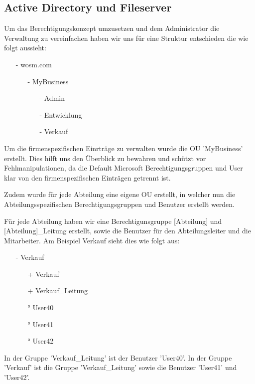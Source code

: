 \documentclass[11pt,a4paper,parskip=half]{scrartcl}
\begin{document}
\subsection{Active Directory und Fileserver}
Um das Berechtigungskonzept umzusetzen und dem Administrator die Verwaltung zu vereinfachen haben wir uns für eine Struktur entschieden die wie folgt aussieht:
\begin{itemize}
\item[-]{wosm.com}
\begin{itemize}
\item[-]{MyBusiness}
\begin{itemize}
\item[-]{Admin}
\item[-]{Entwicklung}
\item[-]{Verkauf}
\end{itemize}
\end{itemize}
\end{itemize}
Um die firmenspezifischen Einrträge zu verwalten wurde die OU 'MyBusiness' erstellt. Dies hilft uns den Überblick zu bewahren und schützt vor Fehlmanipulationen, da die Default Microsoft Berechtigungsgruppen und User klar von den firmenspezifischen Einträgen getrennt ist.

Zudem wurde für jede Abteilung eine eigene OU erstellt, in welcher nun die Abteilungsspezifischen Berechtigungsgruppen und Benutzer erstellt werden.

Für jede Abteilung haben wir eine Berechtigunsgruppe [Abteilung] und [Abteilung]\_Leitung erstellt, sowie die Benutzer für den Abteilungsleiter und die Mitarbeiter. Am Beispiel Verkauf sieht dies wie folgt aus:
\begin{itemize}
\item[-]{Verkauf}
\begin{itemize}
\item[+]{Verkauf}
\item[+]{Verkauf\_Leitung}
\item[°]{User40}
\item[°]{User41}
\item[°]{User42}
\end{itemize}
\end{itemize}
In der Gruppe 'Verkauf\_Leitung' ist der Benutzer 'User40'. In der Gruppe 'Verkauf' ist die Gruppe 'Verkauf\_Leitung' sowie die Benutzer 'User41' und 'User42'.
\end{document}
